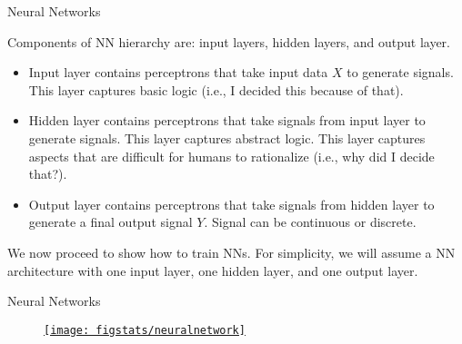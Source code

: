 \documentclass[9pt]{beamer}
\begin{document}

\begin{frame}{Neural Networks}

Components of NN hierarchy are: input layers,  hidden layers, and output layer.
\begin{block}{}
\begin{itemize}
\item Input layer contains perceptrons that take input data $X$ to generate signals. This layer captures basic logic (i.e., I decided  this because of that). 
\item Hidden layer contains perceptrons that take signals from input layer to generate signals. This layer captures abstract logic. This layer captures aspects that are difficult for humans to rationalize (i.e., why did I decide that?). 
\item Output layer contains perceptrons that take signals from hidden layer to generate a final output signal $Y$. Signal can be continuous or discrete. 
\end{itemize}
\end{block}
We now proceed to show how to train NNs. For simplicity, we will assume a NN architecture with one input layer, one hidden layer, and one output layer. 

\end{frame}


\begin{frame}{Neural Networks}

\begin{figure}[!htb]
    \centering
	\href{https://www.neuraldesigner.com/learning/tutorials/neural-network}{\texttt{[image: figstats/neuralnetwork]}}
\end{figure}

\end{frame}

\end{document}

